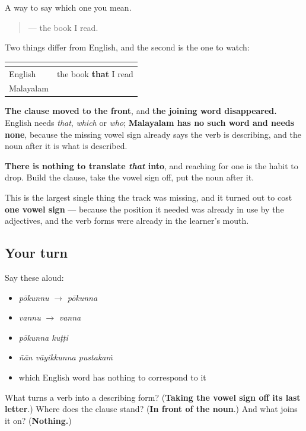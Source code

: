 \begin{grammarlens}[title={What you've built}]
A way to say which one you mean.

\begin{quote}
\textbf{  } — the book I read.
\end{quote}

Two things differ from English, and the second is the one to watch:

\noindent
\begin{tabularx}{\linewidth}{@{}>{\raggedright\arraybackslash}X>{\raggedright\arraybackslash}X@{}}
\toprule
\textbf{} & \textbf{} \\
\midrule
English & the book \textbf{that} I read \\
Malayalam & \textbf{\ml{ഞാൻ} \ml{വായിക്കുന്ന}} \ml{പുസ്തകം} \\
\bottomrule
\end{tabularx}

\textbf{The clause moved to the front}, and \textbf{the joining word disappeared.} English needs \emph{that}, \emph{which} or \emph{who}; \textbf{Malayalam has no such word and needs none}, because the missing vowel sign already says the verb is describing, and the noun after it is what is described.

\textbf{There is nothing to translate \emph{that} into}, and reaching for one is the habit to drop. Build the clause, take the vowel sign off, put the noun after it.

This is the largest single thing the track was missing, and it turned out to cost \textbf{one vowel sign} — because the position it needed was already in use by the adjectives, and the verb forms were already in the learner's mouth.
\end{grammarlens}

\subsection*{Your turn}
Say these aloud:

\begin{itemize}
\raggedright
  \item \emph{pōkunnu} $\to$ \emph{pōkunna}
  \item \emph{vannu} $\to$ \emph{vanna}
  \item \emph{pōkunna kuṭṭi}
  \item \emph{ñān vāyikkunna pustakaṁ}
  \item which English word has nothing to correspond to it
\end{itemize}

\begin{tcolorbox}[breakable,colback=teal!4,colframe=teal!35!black,title={Before you move on}]
What turns a verb into a describing form? (\textbf{Taking the vowel sign off its last letter}.) Where does the clause stand? (\textbf{In front of the noun}.) And what joins it on? (\textbf{Nothing.})
\end{tcolorbox}

